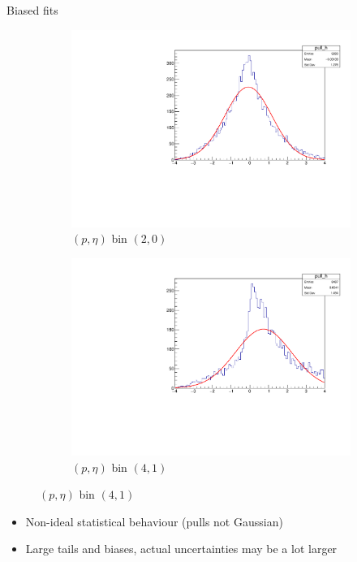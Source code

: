 \documentclass[xcolor={dvipsnames}]{beamer}
\begin{document}
\begin{frame}{Biased fits}
  \vspace{0.0cm}
  \begin{figure}[htb]
    \centering
    \begin{subfigure}{0.45\textwidth}
      \centering
      \includegraphics[width=1.0\textwidth]{Plots/signal_efficiency_pull_MuonUT_P2_ETA0.pdf}
      \caption*{$(p, \eta)$ bin $(2, 0)$}
    \end{subfigure}%
    \begin{subfigure}{0.45\textwidth}
      \centering
      \includegraphics[width=1.0\textwidth]{Plots/signal_efficiency_pull_MuonUT_P4_ETA1.pdf}
      \caption*{$(p, \eta)$ bin $(4, 1)$}
    \end{subfigure}
    \vspace{-0.2cm}
  \end{figure}
  \begin{itemize}
    \item{Non-ideal statistical behaviour (pulls not Gaussian)}
    \item{Large tails and biases, actual uncertainties may be a lot larger}
  \end{itemize}
\end{frame}
\end{document}
